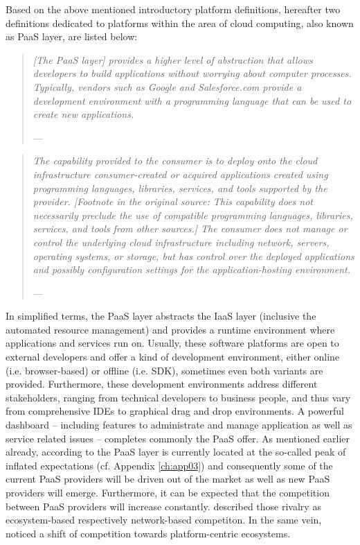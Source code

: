 Based on the above mentioned introductory platform definitions, hereafter two definitions dedicated to platforms within the area of cloud computing, also known as \ac{PaaS} layer, are listed below:

\begin{quotation}{\slshape 
[The \ac{PaaS} layer] provides a higher level of abstraction that allows developers to build applications without worrying about computer processes. Typically, vendors such as Google and Salesforce.com provide a development environment with a programming language that can be used to create new applications.}
\vspace*{-7pt}
\begin{flushright}
	--- \citealp[p. 118]{Iyer2010}
\end{flushright}
\end{quotation}

\begin{quotation}{\slshape 
The capability provided to the consumer is to deploy onto the cloud infrastructure consumer-created or acquired applications created using programming languages, libraries, services, and tools supported by the provider. [Footnote in the original source: This capability does not necessarily preclude the use of compatible programming languages, libraries, services, and tools from other sources.] The consumer does not manage or control the underlying cloud infrastructure including network, servers, operating systems, or storage, but has control over the deployed applications and possibly configuration settings for the application-hosting environment.}
\vspace*{-7pt}
\begin{flushright}
	--- \citealp[pp. 2-3]{Mell2011}
\end{flushright}
\end{quotation}

In simplified terms, the \ac{PaaS} layer abstracts the \ac{IaaS} layer (inclusive the automated resource management) and provides a runtime environment where applications and services run on. Usually, these software platforms are open to external developers and offer a kind of development environment, either online (i.e. browser-based) or offline (i.e. \ac{SDK}), sometimes even both variants are provided. Furthermore, these development environments address different stakeholders, ranging from technical developers to business people, and thus vary from comprehensive \acp{IDE} to graphical drag and drop environments. A powerful dashboard -- including features to administrate and manage application as well as service related issues -- completes commonly the \ac{PaaS} offer.
As mentioned earlier already, according to \citet[p. 5]{Smith2012} the \ac{PaaS} layer is currently located at the so-called peak of inflated expectations (cf. Appendix \ref{ch:app03}) and consequently some of the current \ac{PaaS} providers will be driven out of the market as well as new \ac{PaaS} providers will emerge. Furthermore, it can be expected that the competition between \ac{PaaS} providers will increase constantly. \citet[pp. 117,128-129]{Iyer2010} described those rivalry as ecosystem-based respectively network-based competiton. In the same vein, \citet[pp. 675-676]{Tiwana2010} noticed a shift of competition towards platform-centric ecosystems.
